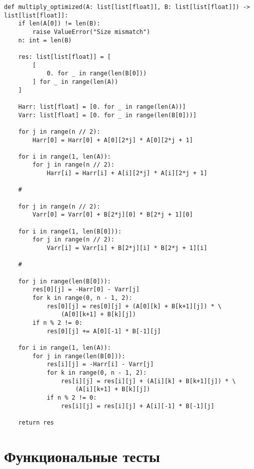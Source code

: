 \begin{lstlisting}[caption={Алгоритм Копперсмита-Винограда умножения матриц}]
def multiply_optimized(A: list[list[float]], B: list[list[float]]) -> list[list[float]]:
    if len(A[0]) != len(B):
        raise ValueError("Size mismatch")
    n: int = len(B)

    res: list[list[float]] = [
        [
            0. for _ in range(len(B[0]))
        ] for _ in range(len(A))
    ]

    Harr: list[float] = [0. for _ in range(len(A))]
    Varr: list[float] = [0. for _ in range(len(B[0]))]

    for j in range(n // 2):
        Harr[0] = Harr[0] + A[0][2*j] * A[0][2*j + 1]

    for i in range(1, len(A)):
        for j in range(n // 2):
            Harr[i] = Harr[i] + A[i][2*j] * A[i][2*j + 1]

    #

    for j in range(n // 2):
        Varr[0] = Varr[0] + B[2*j][0] * B[2*j + 1][0]

    for i in range(1, len(B[0])):
        for j in range(n // 2):
            Varr[i] = Varr[i] + B[2*j][i] * B[2*j + 1][i]

    #

    for j in range(len(B[0])):
        res[0][j] = -Harr[0] - Varr[j]
        for k in range(0, n - 1, 2):
            res[0][j] = res[0][j] + (A[0][k] + B[k+1][j]) * \
                (A[0][k+1] + B[k][j])
        if n % 2 != 0:
            res[0][j] += A[0][-1] * B[-1][j]

    for i in range(1, len(A)):
        for j in range(len(B[0])):
            res[i][j] = -Harr[i] - Varr[j]
            for k in range(0, n - 1, 2):
                res[i][j] = res[i][j] + (A[i][k] + B[k+1][j]) * \
                    (A[i][k+1] + B[k][j])
            if n % 2 != 0:
                res[i][j] = res[i][j] + A[i][-1] * B[-1][j]

    return res
\end{lstlisting}

\section{Функциональные тесты}


